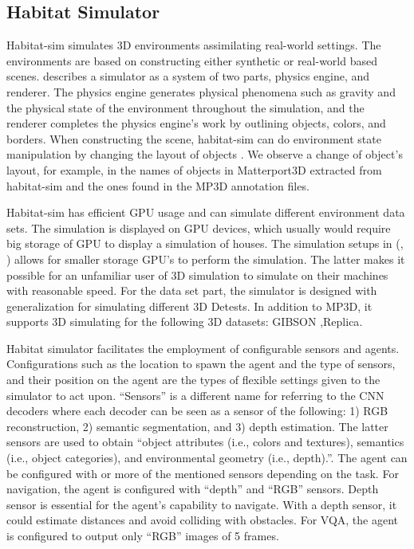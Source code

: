 \subsection{Habitat Simulator}


Habitat-sim simulates 3D environments assimilating real-world settings. The environments are based on constructing either synthetic or real-world based scenes. \cite{szot2021habitat} describes a simulator as a system of two parts, physics engine, and renderer. The physics engine generates physical phenomena such as gravity and the physical state of the environment throughout the simulation, and the renderer completes the physics engine’s work by outlining objects, colors, and borders. When constructing the scene, habitat-sim can do environment state manipulation by changing the layout of objects \cite{habitat19iccv}. We observe a change of object’s layout, for example, in the names of objects in Matterport3D extracted from habitat-sim and the ones found in the MP3D annotation files. 

Habitat-sim has efficient GPU usage and can simulate different environment data sets. The simulation is displayed on GPU devices, which usually would require big storage of GPU to display a simulation of houses. The simulation setups in (\cite{szot2021habitat}, \cite{habitat19iccv}) allows for smaller storage GPU’s to perform the simulation. The latter makes it possible for an unfamiliar user of 3D simulation to simulate on their machines with reasonable speed. For the data set part, the simulator is designed with generalization for simulating different 3D Detests. In addition to MP3D, it supports 3D simulating for the following 3D datasets: GIBSON \cite{xia2018gibson},Replica\cite{straub2019replica}.


Habitat simulator facilitates the employment of configurable sensors and agents. Configurations such as the location to spawn the agent and the type of sensors, and their position on the agent are the types of flexible settings given to the simulator to act upon. “Sensors” is a different name for referring to the CNN decoders where each decoder can be seen as a sensor of the following: 1) RGB reconstruction, 2) semantic segmentation, and 3) depth estimation. The latter sensors are used to obtain “object attributes (i.e., colors and textures), semantics (i.e., object categories), and environmental geometry (i.e., depth).”. The agent can be configured with or more of the mentioned sensors depending on the task. For navigation, the agent is configured with “depth” and “RGB” sensors. Depth sensor is essential for the agent’s capability to navigate. With a depth sensor, it could estimate distances and avoid colliding with obstacles. For VQA, the agent is configured to output only “RGB” images of 5 frames. 



